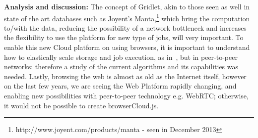 \textbf{Analysis and discussion: }
%
The concept of Gridlet, akin to those seen as well in state of the art databases such as Joyent's Manta,\footnote{http://www.joyent.com/products/manta - seen in December 2013} which bring the computation to/with the data, reducing the possibility of a network bottleneck and increases the flexibility to use the platform for new type of jobs, will very important. To enable this new Cloud platform on using browsers, it is important to understand how to elastically scale storage and job execution, as in~\cite{Silva2011}, but in peer-to-peer networks: therefore a study of the current algorithms and its capabilities was needed. Lastly, browsing the web is almost as old as the Internet itself, however on the last few years, we are seeing the Web Platform rapidly changing, and enabling new possibilities with peer-to-peer technology e.g. WebRTC; otherwise, it would not be possible to create browserCloud.js. 
